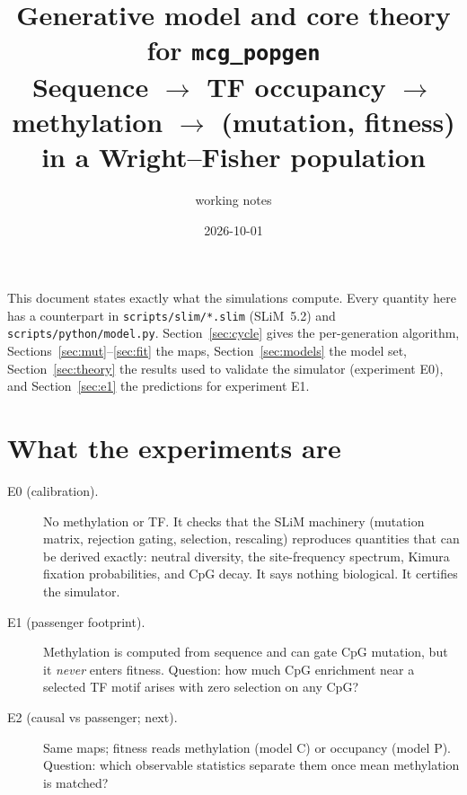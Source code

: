\documentclass[11pt]{article}
\title{Generative model and core theory for \texttt{mcg\_popgen}\\[2pt]
\large Sequence $\to$ TF occupancy $\to$ methylation $\to$ (mutation, fitness) in a Wright--Fisher population}
\author{working notes}
\date{2026-10-01}
\theoremstyle{definition}
\begin{document}
\maketitle

\noindent This document states exactly what the simulations compute. Every quantity here has a counterpart in
\texttt{scripts/slim/*.slim} (SLiM~5.2) and \texttt{scripts/python/model.py}. Section~\ref{sec:cycle} gives the
per-generation algorithm, Sections~\ref{sec:mut}--\ref{sec:fit} the maps, Section~\ref{sec:models} the model set,
Section~\ref{sec:theory} the results used to validate the simulator (experiment E0), and Section~\ref{sec:e1} the
predictions for experiment E1.

\section{What the experiments are}
\begin{description}
\item[E0 (calibration).] No methylation or TF. It checks that the SLiM machinery (mutation matrix, rejection gating,
  selection, rescaling) reproduces quantities that can be derived exactly: neutral diversity, the site-frequency
  spectrum, Kimura fixation probabilities, and CpG decay. It says nothing biological. It certifies the simulator.
\item[E1 (passenger footprint).] Methylation is computed from sequence and can gate CpG mutation, but it
  \emph{never} enters fitness. Question: how much CpG enrichment near a selected TF motif arises with zero selection
  on any CpG?
\item[E2 (causal vs passenger; next).] Same maps; fitness reads methylation (model C) or occupancy (model P).
  Question: which observable statistics separate them once mean methylation is matched?
\end{description}
\end{document}
